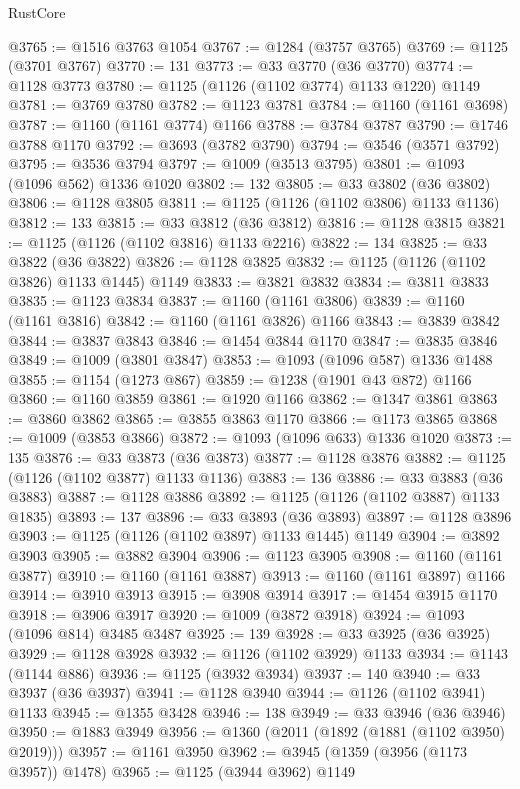 \begin{lexlean}{RustCore}
\begin{coremodule}
@3765 := @1516 @3763 @1054
@3767 := @1284 (@3757 @3765)
@3769 := @1125 (@3701 @3767)
@3770 := 131
@3773 := @33 @3770 (@36 @3770)
@3774 := @1128 @3773
@3780 := @1125 (@1126 (@1102 @3774) @1133 @1220) @1149
@3781 := @3769 @3780
@3782 := @1123 @3781
@3784 := @1160 (@1161 @3698)
@3787 := @1160 (@1161 @3774) @1166
@3788 := @3784 @3787
@3790 := @1746 @3788 @1170
@3792 := @3693 (@3782 @3790)
@3794 := @3546 (@3571 @3792)
@3795 := @3536 @3794
@3797 := @1009 (@3513 @3795)
@3801 := @1093 (@1096 @562) @1336 @1020
@3802 := 132
@3805 := @33 @3802 (@36 @3802)
@3806 := @1128 @3805
@3811 := @1125 (@1126 (@1102 @3806) @1133 @1136)
@3812 := 133
@3815 := @33 @3812 (@36 @3812)
@3816 := @1128 @3815
@3821 := @1125 (@1126 (@1102 @3816) @1133 @2216)
@3822 := 134
@3825 := @33 @3822 (@36 @3822)
@3826 := @1128 @3825
@3832 := @1125 (@1126 (@1102 @3826) @1133 @1445) @1149
@3833 := @3821 @3832
@3834 := @3811 @3833
@3835 := @1123 @3834
@3837 := @1160 (@1161 @3806)
@3839 := @1160 (@1161 @3816)
@3842 := @1160 (@1161 @3826) @1166
@3843 := @3839 @3842
@3844 := @3837 @3843
@3846 := @1454 @3844 @1170
@3847 := @3835 @3846
@3849 := @1009 (@3801 @3847)
@3853 := @1093 (@1096 @587) @1336 @1488
@3855 := @1154 (@1273 @867)
@3859 := @1238 (@1901 @43 @872) @1166
@3860 := @1160 @3859
@3861 := @1920 @1166
@3862 := @1347 @3861
@3863 := @3860 @3862
@3865 := @3855 @3863 @1170
@3866 := @1173 @3865
@3868 := @1009 (@3853 @3866)
@3872 := @1093 (@1096 @633) @1336 @1020
@3873 := 135
@3876 := @33 @3873 (@36 @3873)
@3877 := @1128 @3876
@3882 := @1125 (@1126 (@1102 @3877) @1133 @1136)
@3883 := 136
@3886 := @33 @3883 (@36 @3883)
@3887 := @1128 @3886
@3892 := @1125 (@1126 (@1102 @3887) @1133 @1835)
@3893 := 137
@3896 := @33 @3893 (@36 @3893)
@3897 := @1128 @3896
@3903 := @1125 (@1126 (@1102 @3897) @1133 @1445) @1149
@3904 := @3892 @3903
@3905 := @3882 @3904
@3906 := @1123 @3905
@3908 := @1160 (@1161 @3877)
@3910 := @1160 (@1161 @3887)
@3913 := @1160 (@1161 @3897) @1166
@3914 := @3910 @3913
@3915 := @3908 @3914
@3917 := @1454 @3915 @1170
@3918 := @3906 @3917
@3920 := @1009 (@3872 @3918)
@3924 := @1093 (@1096 @814) @3485 @3487
@3925 := 139
@3928 := @33 @3925 (@36 @3925)
@3929 := @1128 @3928
@3932 := @1126 (@1102 @3929) @1133
@3934 := @1143 (@1144 @886)
@3936 := @1125 (@3932 @3934)
@3937 := 140
@3940 := @33 @3937 (@36 @3937)
@3941 := @1128 @3940
@3944 := @1126 (@1102 @3941) @1133
@3945 := @1355 @3428
@3946 := 138
@3949 := @33 @3946 (@36 @3946)
@3950 := @1883 @3949
@3956 := @1360 (@2011 (@1892 (@1881 (@1102 @3950) @2019)))
@3957 := @1161 @3950
@3962 := @3945 (@1359 (@3956 (@1173 @3957)) @1478)
@3965 := @1125 (@3944 @3962) @1149

\end{coremodule}
\end{lexlean}
